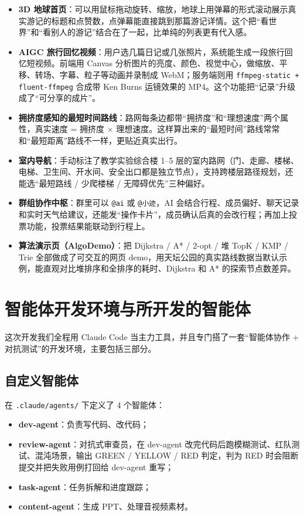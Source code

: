 \documentclass[UTF8,a4paper,12pt]{ctexart}
\begin{document}
\begin{itemize}
\item \textbf{3D 地球首页}：可以用鼠标拖动旋转、缩放，地球上用弹幕的形式滚动展示真实游记的标题和点赞数，点弹幕能直接跳到那篇游记详情。这个把“看世界”和“看别人的游记”结合在了一起，比单纯的列表更有代入感。
\item \textbf{AIGC 旅行回忆视频}：用户选几篇日记或几张照片，系统能生成一段旅行回忆短视频。前端用 Canvas 分析图片的亮度、颜色、视觉中心，做缩放、平移、转场、字幕、粒子等动画并录制成 WebM；服务端则用 \texttt{ffmpeg-static + fluent-ffmpeg} 合成带 Ken Burns 运镜效果的 MP4。这个功能把“记录”升级成了“可分享的成片”。
\item \textbf{拥挤度感知的最短时间路线}：路网每条边都带“拥挤度”和“理想速度”两个属性，真实速度 = 拥挤度 $\times$ 理想速度。这样算出来的“最短时间”路线常常和“最短距离”路线不一样，更贴近真实出行。
\item \textbf{室内导航}：手动标注了教学实验综合楼 1--5 层的室内路网（门、走廊、楼梯、电梯、卫生间、开水间、安全出口都是独立节点），支持跨楼层路径规划，还能选“最短路线 / 少爬楼梯 / 无障碍优先”三种偏好。
\item \textbf{群组协作中枢}：群里可以 \texttt{@ai} 或 \texttt{@小迹}，AI 会结合行程、成员偏好、聊天记录和实时天气给建议，还能发“操作卡片”，成员确认后真的会改行程；再加上投票功能，投票结果能联动到行程上。
\item \textbf{算法演示页（AlgoDemo）}：把 Dijkstra / A* / 2-opt / 堆 TopK / KMP / Trie 全部做成了可交互的网页 demo，用天坛公园的真实路线数据当默认示例，能直观对比堆排序和全排序的耗时、Dijkstra 和 A* 的探索节点数差异。
\end{itemize}

\section{智能体开发环境与所开发的智能体}

这次开发我们全程用 Claude Code 当主力工具，并且专门搭了一套“智能体协作 + 对抗测试”的开发环境，主要包括三部分。

\subsection{自定义智能体}
在 \texttt{.claude/agents/} 下定义了 4 个智能体：
\begin{itemize}
\item \textbf{dev-agent}：负责写代码、改代码；
\item \textbf{review-agent}：对抗式审查员，在 dev-agent 改完代码后跑模糊测试、红队测试、混沌场景，输出 GREEN / YELLOW / RED 判定，判为 RED 时会阻断提交并把失败用例打回给 dev-agent 重写；
\item \textbf{task-agent}：任务拆解和进度跟踪；
\item \textbf{content-agent}：生成 PPT、处理音视频素材。
\end{itemize}
\end{document}
